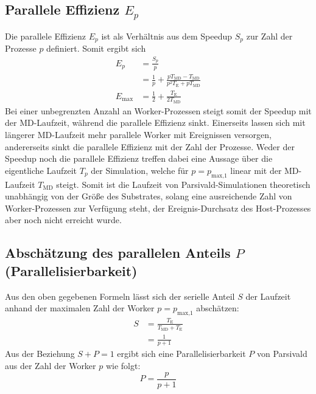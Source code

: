
\subsection{Parallele Effizienz $E_p$}

Die parallele Effizienz $E_p$ ist als Verhältnis aus dem Speedup $S_p$ zur Zahl der Prozesse $p$ definiert.
Somit ergibt sich 
\begin{align}
  E_p & = \frac{S_p}{p} \\
  & = \frac{1}{p} + \frac{p T_\text{MD} - T_\text{MD}}{p^2 T_\text{E} + p T_\text{MD}} \\
  E_\text{max} & = \frac{1}{2} + \frac{T_\text{E}}{2 T_\text{MD}}
\end{align}
Bei einer unbegrenzten Anzahl an Worker-Prozessen steigt somit der Speedup mit der MD-Laufzeit, während die parallele Effizienz sinkt.
Einerseits lassen sich mit längerer MD-Laufzeit mehr parallele Worker mit Ereignissen versorgen, andererseits sinkt die parallele Effizienz mit der Zahl der Prozesse.
Weder der Speedup noch die parallele Effizienz treffen dabei eine Aussage über die eigentliche Laufzeit $T_p$ der Simulation, welche für $p = p_\text{max,1}$ linear mit der MD-Laufzeit $T_\text{MD}$ steigt.
Somit ist die Laufzeit von Parsivald-Simulationen theoretisch unabhängig von der Größe des Substrates, solang eine ausreichende Zahl von Worker-Prozessen zur Verfügung steht, der Ereignis-Durchsatz des Host-Prozesses aber noch nicht erreicht wurde.

\subsection{Abschätzung des parallelen Anteils $P$ (Parallelisierbarkeit)}

Aus den oben gegebenen Formeln lässt sich der serielle Anteil $S$ der Laufzeit anhand der maximalen Zahl der Worker $p = p_\text{max,1}$ abschätzen:
\begin{align}
  S & = \frac{T_\text{E}}{T_\text{MD} + T_\text{E}} \\
    & = \frac{1}{p + 1}
\end{align}
Aus der Beziehung $S + P = 1$ ergibt sich eine Parallelisierbarkeit $P$ von Parsivald aus der Zahl der Worker $p$ wie folgt:
\begin{equation}
  P = \frac{p}{p+1}
\end{equation}
